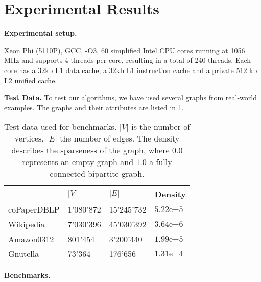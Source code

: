 \documentclass[letterpaper]{article}
\newcommand{\mypar}[1]{{\bf #1.}}
\begin{document}
\section{Experimental Results}\label{sec:exp}


\mypar{Experimental setup} 

Xeon Phi (5110P), GCC, -O3, 60 simplified Intel CPU cores running at 1056 MHz and supports 4 threads per core, resulting in a total of 240 threads. Each core has a 32kb L1 data cache, a 32kb L1 instruction cache and a private 512 kb L2 unified cache. \cite{Ramos:2013}

\mypar{Test Data}
To test our algorithms, we have used several graphs from real-world examples. The graphs and their attributes are listed in \ref{table:testdata}. \\
\begin{table}
\centering
\begin{tabular}{ |l|l|l|l| }
\hline
 & $\lvert V \rvert$ & $\lvert E \rvert$ & Density \\ \hline
coPaperDBLP & 1'080'872 & 15'245'732 & $5.22\mathrm{e}{-5}$ \\ \hline
Wikipedia & 7'030'396 & 45'030'392 & $3.64\mathrm{e}{-6}$ \\ \hline
Amazon0312 & 801'454 & 3'200'440 & $1.99\mathrm{e}{-5}$ \\ \hline
Gnutella & 73'364 & 176'656 & $1.31\mathrm{e}{-4}$ \\ \hline
\end{tabular}
\caption{Test data used for benchmarks. $\lvert V \rvert$ is the number of vertices, $\lvert E \rvert$ the number of edges. The density describes the sparseness of the graph, where $0.0$ represents an empty graph and $1.0$ a fully connected bipartite graph.}
\label{table:testdata}
\end{table}
\mypar{Benchmarks}
\end{document}

